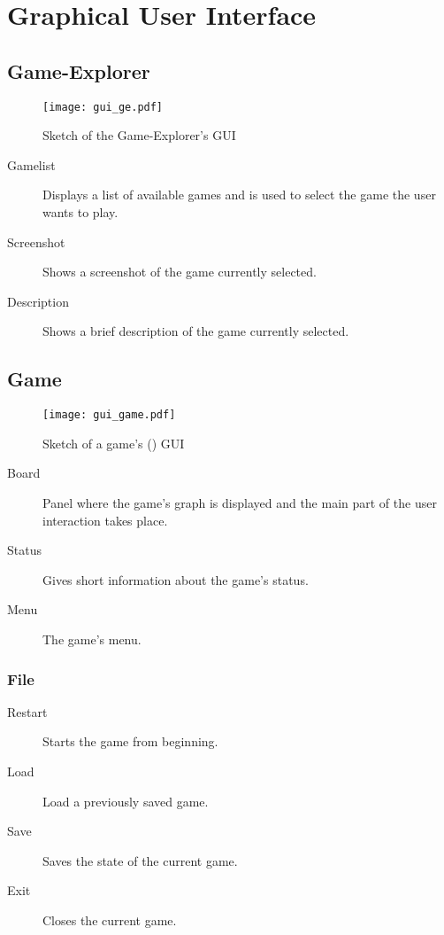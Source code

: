 \section{Graphical User Interface}
\subsection{Game-Explorer}\label{REF:GAME-EXPLORER}

\begin{figure}[h]
	\centering
	\texttt{[image: gui\_ge.pdf]}
	\caption{Sketch of the Game-Explorer's GUI}
	\label{img:GE_GUI}
\end{figure}

\begin{description}
	\item[Gamelist] Displays a list of available games and is used to select the game the user wants to play.
	\item[Screenshot] Shows a screenshot of the game currently selected.
	\item[Description] Shows a brief description of the game currently selected.
\end{description}

\subsection{Game} \label{REF:GUI_GAME}

\begin{figure}[H]
	\centering
	\texttt{[image: gui\_game.pdf]}
	\caption{Sketch of a game's (\twixt) \gls{GUI}}
	\label{img:GAME_GUI}
\end{figure}

\begin{description}
	\item[Board] Panel where the game's graph is displayed and the main part of the user interaction takes place.
	\item[Status] Gives short information about the game's status.
	\item[Menu] The game's menu.
\end{description}

\subsubsection{File}
\begin{description}
	\item[Restart] Starts the game from beginning.
	\item[Load] Load a previously saved game.
	\item[Save] Saves the state of the current game.
	\item[Exit] Closes the current game.
\end{description}
